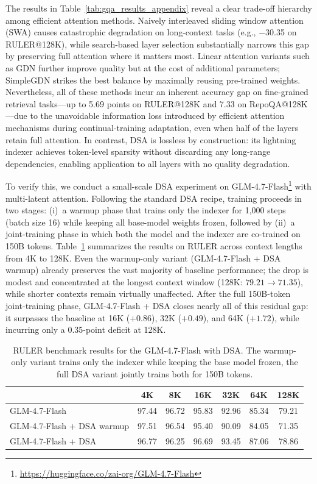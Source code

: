 \documentclass{article}
\theoremstyle{definition}
\begin{document}
The results in Table~\ref{tab:gqa_results_appendix} reveal a clear trade-off hierarchy among efficient attention methods. Naively interleaved sliding window attention (SWA) causes catastrophic degradation on long-context tasks (e.g., $-$30.35 on RULER@128K), while search-based layer selection substantially narrows this gap by preserving full attention where it matters most. Linear attention variants such as GDN further improve quality but at the cost of additional parameters; SimpleGDN strikes the best balance by maximally reusing pre-trained weights. Nevertheless, all of these methods incur an inherent accuracy gap on fine-grained retrieval tasks—up to 5.69 points on RULER@128K and 7.33 on RepoQA@128K—due to the unavoidable information loss introduced by efficient attention mechanisms during continual-training adaptation, even when half of the layers retain full attention. In contrast, DSA is lossless by construction: its lightning indexer achieves token-level sparsity without discarding any long-range dependencies, enabling application to all layers with no quality degradation.

To verify this, we conduct a small-scale DSA experiment on GLM-4.7-Flash\footnote{\url{https://huggingface.co/zai-org/GLM-4.7-Flash}} with multi-latent attention. Following the standard DSA recipe, training proceeds in two stages: (i)~a {warmup} phase that trains only the indexer for 1{,}000 steps (batch size 16) while keeping all base-model weights frozen, followed by (ii)~a {joint-training} phase in which both the model and the indexer are co-trained on 150B tokens.
Table~\ref{tab:dsa_ruler_results} summarizes the results on RULER across context lengths from 4K to 128K. Even the warmup-only variant ({GLM-4.7-Flash + DSA warmup}) already preserves the vast majority of baseline performance; the drop is modest and concentrated at the longest context window (128K: $79.21 \to 71.35$), while shorter contexts remain virtually unaffected. After the full 150B-token joint-training phase, {GLM-4.7-Flash + DSA} closes nearly all of this residual gap: it {surpasses} the baseline at 16K ($+0.86$), 32K ($+0.49$), and 64K ($+1.72$), while incurring only a 0.35-point deficit at 128K.

\begin{table}[t]
    \small
    \centering
    \caption{RULER benchmark results for the GLM-4.7-Flash with DSA.
    The warmup-only variant trains only the indexer while
    keeping the base model frozen, the full DSA variant jointly trains both for
    150B tokens. }
   \label{tab:dsa_ruler_results}
    \begin{tabular}{lcccccc}
        \toprule
         & {4K} & {8K} & {16K} & {32K} & {64K} & {128K} \\
        \midrule
        GLM-4.7-Flash  & 97.44 & 96.72 & 95.83 & 92.96 & 85.34 & 79.21 \\
        GLM-4.7-Flash + DSA warmup & 97.51 & 96.54 & 95.40 & 90.09 & 84.05 & 71.35  \\
        GLM-4.7-Flash + DSA & 96.77 & 96.25 & 96.69 & 93.45 & 87.06 & 78.86 \\
        \bottomrule
    \end{tabular}
\end{table}
\end{document}
